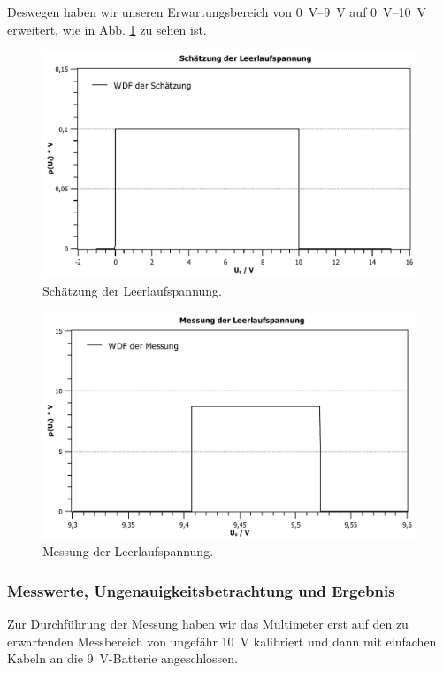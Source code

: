 \documentclass[11pt,a4paper,titlepage, ngerman]{article}
\begin{document}
				Deswegen haben wir unseren Erwartungsbereich von \SIrange{0}{9}{\V} auf \SIrange{0}{10}{\V} erweitert, wie in Abb. \ref{fig:spannung} zu sehen ist.			
				\begin{figure}	
					\centering
					\includegraphics[scale=0.8]{Spannungsschaetzung.pdf}
					\caption{Schätzung der Leerlaufspannung.}
					\label{fig:spannung}
				\end{figure}		
				\begin{figure}	
					\centering
					\includegraphics[scale=0.8]{Spannungsmessung.pdf} %
					\caption{Messung der Leerlaufspannung.}
					\label{fig:spannung2}
				\end{figure}	
				
			\subsubsection{Messwerte, Ungenauigkeitsbetrachtung und Ergebnis}
				\label{2.1.2}	
					
				Zur Durchführung der Messung haben wir das Multimeter erst auf den zu erwartenden Messbereich von ungefähr \SI{10}{\V} kalibriert und dann mit einfachen Kabeln an die \SI{9}{\V}-Batterie angeschlossen.
						
\end{document}
